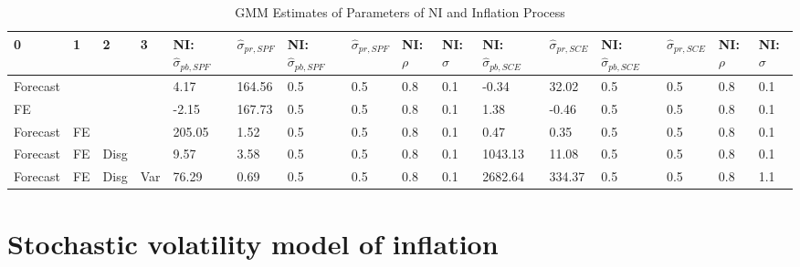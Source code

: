 \documentclass[]{article}
\begin{document}
\begin{table}
	\centering
	\caption{GMM Estimates of Parameters of NI and Inflation Process}
	\label{GMM_Est_NI_Table}
\begin{tabular}{llllllllllllllll}
	0        & 1  & 2    & 3   & NI: $\hat\sigma_{pb,SPF}$ & $\hat\sigma_{pr,SPF}$ & NI: $\hat\sigma_{pb,SPF}$ & $\hat\sigma_{pr,SPF}$ & NI: $\rho$ & NI: $\sigma$ & NI: $\hat\sigma_{pb,SCE}$ & $\hat\sigma_{pr,SCE}$ & NI: $\hat\sigma_{pb,SCE}$ & $\hat\sigma_{pr,SCE}$ & NI: $\rho$ & NI: $\sigma$ \\
		\hline 
	Forecast &    &      &     & 4.17                      & 164.56                & 0.5                       & 0.5                   & 0.8        & 0.1          & -0.34                     & 32.02                 & 0.5                       & 0.5                   & 0.8        & 0.1          \\
		\hline 
	FE       &    &      &     & -2.15                     & 167.73                & 0.5                       & 0.5                   & 0.8        & 0.1          & 1.38                      & -0.46                 & 0.5                       & 0.5                   & 0.8        & 0.1          \\
		\hline 
	Forecast & FE &      &     & 205.05                    & 1.52                  & 0.5                       & 0.5                   & 0.8        & 0.1          & 0.47                      & 0.35                  & 0.5                       & 0.5                   & 0.8        & 0.1          \\
		\hline 
	Forecast & FE & Disg &     & 9.57                      & 3.58                  & 0.5                       & 0.5                   & 0.8        & 0.1          & 1043.13                   & 11.08                 & 0.5                       & 0.5                   & 0.8        & 0.1          \\
		\hline 
	Forecast & FE & Disg & Var & 76.29                     & 0.69                  & 0.5                       & 0.5                   & 0.8        & 0.1          & 2682.64                   & 334.37                & 0.5                       & 0.5                   & 0.8        & 1.1         \\
	\hline 
\end{tabular}
\end{table}

\section{Stochastic volatility model of inflation}
\end{document}
